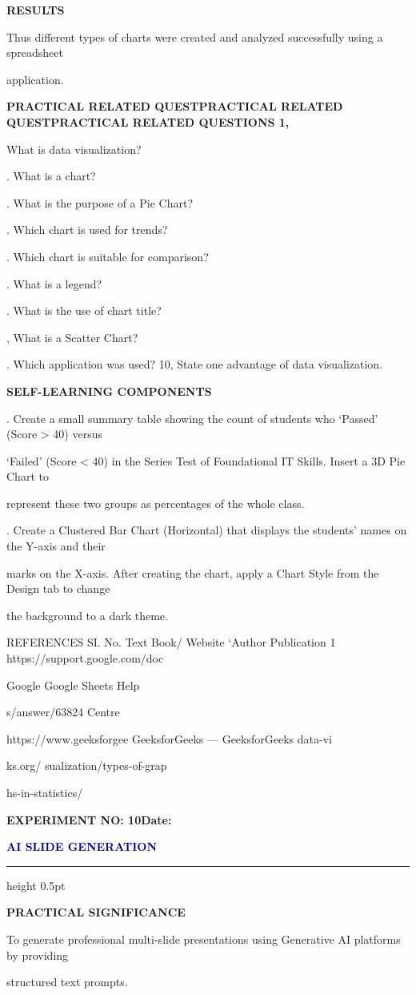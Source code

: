 \documentclass[10pt,a4paper]{article}
\newcommand{\expheading}[2]{%
  \vspace{0.1cm}\noindent\textbf{\large EXPERIMENT NO: #1}\hfill\textbf{Date: #2}\par
}
\newcommand{\exptitle}[1]{%
  \begin{center}\vspace{-2mm}\textcolor{navy}{\fontsize{20}{22}\selectfont\bfseries #1}\end{center}
  \vspace{1mm}\hrule height 0.5pt\vspace{3mm}
}
\begin{document}
\medskip\noindent\textbf{RESULTS}\par
\noindent Thus different types of charts were created and analyzed successfully using a spreadsheet\par
\noindent application.\par
\clearpage
\medskip\noindent\textbf{PRACTICAL RELATED QUESTPRACTICAL RELATED QUESTPRACTICAL RELATED QUESTIONS 1,}\par
\noindent What is data visualization?\par
{}. What is a chart?\par
{}. What is the purpose of a Pie Chart?\par
{}. Which chart is used for trends?\par
{}. Which chart is suitable for comparison?\par
{}. What is a legend?\par
{}. What is the use of chart title?\par
{}, What is a Scatter Chart?\par
{}. Which application was used? 10, State one advantage of data visualization.\par

\medskip\noindent\textbf{SELF-LEARNING COMPONENTS}\par
{}. Create a small summary table showing the count of students who ‘Passed’ (Score > 40) versus\par
\noindent ‘Failed’ (Score < 40) in the Series Test of Foundational IT Skills. Insert a 3D Pie Chart to\par
\noindent represent these two groups as percentages of the whole class.\par
{}. Create a Clustered Bar Chart (Horizontal) that displays the students’ names on the Y-axis and their\par
\noindent marks on the X-axis. After creating the chart, apply a Chart Style from the Design tab to change\par
\noindent the background to a dark theme.\par
\noindent REFERENCES SI. No. Text Book/ Website ‘Author Publication 1 https://support.google.com/doc\par
\noindent Google Google Sheets Help\par
\noindent s/answer/63824 Centre\par

                           https://www.geeksforgee   GeeksforGeeks      — GeeksforGeeks data-vi\par
\noindent ks.org/                                      sualization/types-of-grap\par
\noindent hs-in-statistics/\par
\clearpage
\expheading{10}{\underline{\hspace{1.8cm}}}
\exptitle{AI SLIDE GENERATION}
\medskip\noindent\textbf{PRACTICAL SIGNIFICANCE}\par
\noindent To generate professional multi-slide presentations using Generative AI platforms by providing\par
\noindent structured text prompts.\par
\end{document}
